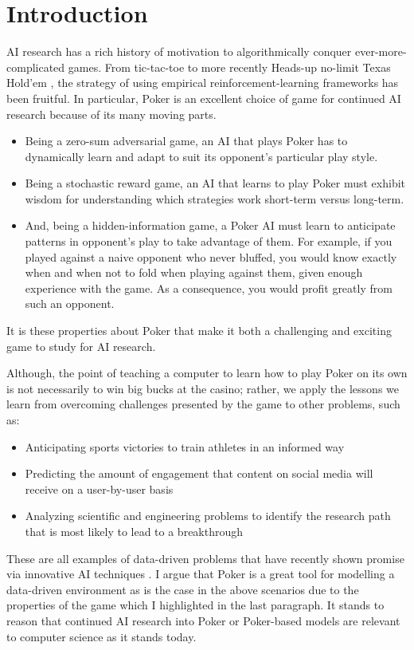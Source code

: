 \documentclass[11pt]{article}
\begin{document}
\section{Introduction}
AI research has a rich history of motivation to algorithmically conquer ever-more-complicated games. From tic-tac-toe to more recently Heads-up no-limit Texas Hold'em \cite{Brown-2018}, the strategy of using empirical reinforcement-learning frameworks has been fruitful. In particular, Poker is an excellent choice of game for continued AI research because of its many moving parts. 
\begin{itemize}
     \item Being a zero-sum adversarial game, an AI that plays Poker has to dynamically learn and adapt to suit its opponent's particular play style. 
     \item Being a stochastic reward game, an AI that learns to play Poker must exhibit wisdom for understanding which strategies work short-term versus long-term.
     \item And, being a hidden-information game, a Poker AI must learn to anticipate patterns in opponent's play to take advantage of them. For example, if you played against a naive opponent who never bluffed, you would know exactly when and when not to fold when playing against them, given enough experience with the game. As a consequence, you would profit greatly from such an opponent. 
\end{itemize}
It is these properties about Poker that make it both a challenging and exciting game to study for AI research.

Although, the point of teaching a computer to learn how to play Poker on its own is not necessarily to win big bucks at the casino; rather, we apply the lessons we learn from overcoming challenges presented by the game to other problems, such as:
\begin{itemize}
    \item Anticipating sports victories to train athletes in an informed way
    \item Predicting the amount of engagement that content on social media will receive on a user-by-user basis
    \item Analyzing scientific and engineering problems to identify the research path that is most likely to lead to a breakthrough
\end{itemize}
These are all examples of data-driven problems that have recently shown promise via innovative AI techniques \cite{Bunk-2017}. I argue that Poker is a great tool for modelling a data-driven environment as is the case in the above scenarios due to the properties of the game which I highlighted in the last paragraph. It stands to reason that continued AI research into Poker or Poker-based models are relevant to computer science as it stands today.
\end{document}
